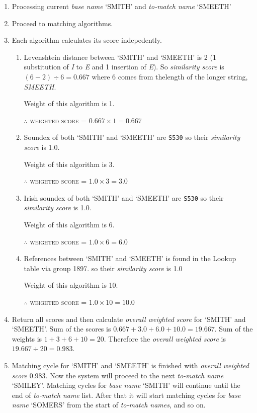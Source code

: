 \begin{enumerate}
  \item Processing current \emph{base name} `SMITH' and \emph{to-match name} `SMEETH'
  \item Proceed to matching algorithms.
  \item Each algorithm calculates its score indepedently.
    \begin{enumerate}
      \item Levenshtein distance between `SMITH' and `SMEETH' is 2
        (1 substitution of \emph{I} to \emph{E} and 1 insertion of \emph{E}).
        So \emph{similarity score} is $(6 - 2) \div 6 = 0.667$ where 6 comes from thelength of the
        longer string, \emph{SMEETH}.

        Weight of this algorithm is 1.

        \textsc{$\therefore$ weighted score = $0.667 \times 1 = 0.667$}
      \item Soundex of both `SMITH' and `SMEETH' are \texttt{S530} so their
        \emph{similarity score} is 1.0.

        Weight of this algorithm is 3.

        \textsc{$\therefore$ weighted score = $1.0 \times 3 = 3.0$}
      \item Irish soundex of both `SMITH' and `SMEETH' are \texttt{S530} so their
        \emph{similarity score} is 1.0.

        Weight of this algorithm is 6.

        \textsc{$\therefore$ weighted score = $1.0 \times 6 = 6.0$}
      \item References between `SMITH' and `SMEETH' is found in the
        Lookup table via group 1897. so their \emph{similarity score} is 1.0

        Weight of this algorithm is 10.

        \textsc{$\therefore$ weighted score = $1.0 \times 10 = 10.0$}
    \end{enumerate}
  \item Return all scores and then calculate \emph{overall weighted score}
    for `SMITH' and `SMEETH'. Sum of the scores is
    $0.667 + 3.0 + 6.0 + 10.0 = 19.667$. Sum of the weights is
    $1 + 3 + 6 + 10 = 20$. Therefore the \emph{overall weighted score} is
    $19.667 \div 20 = 0.983$.
  \item Matching cycle for `SMITH' and `SMEETH' is finished with
    \emph{overall weighted score} 0.983.
    Now the system will proceed to the next \emph{to-match name} `SMILEY'.
    Matching cycles for \emph{base name} `SMITH' will continue until
    the end of \emph{to-match name} list. After that it will start
    matching cycles for \emph{base name} `SOMERS' from the start of
    \emph{to-match names}, and so on.
\end{enumerate}

